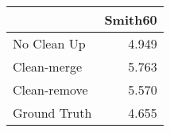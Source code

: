\begin{tabular}{lr}
\toprule
{} & Smith60 \\
\midrule
No Clean Up  &   4.949 \\
Clean-merge  &   5.763 \\
Clean-remove &   5.570 \\
Ground Truth &   4.655 \\
\bottomrule
\end{tabular}
